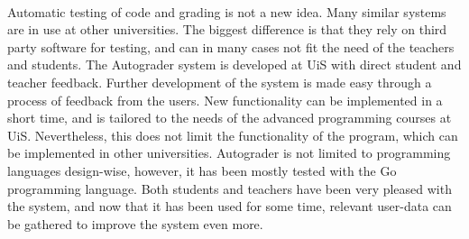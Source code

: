 \\Automatic testing of code and grading is not a new idea. Many similar systems are in use at other universities. The biggest difference is that they rely on third party software for testing, and can in many cases not fit the need of the teachers and students. The Autograder system is developed at UiS with direct student and teacher feedback. Further development of the system is made easy through a process of feedback from the users. New functionality can be implemented in a short time, and is tailored to the needs of the advanced programming courses at UiS. Nevertheless, this does not limit the functionality of the program, which can be implemented in other universities. Autograder is not limited to programming languages design-wise, however, it has been mostly tested with the Go programming language. Both students and teachers have been very pleased with the system, and now that it has been used for some time, relevant user-data can be gathered to improve the system even more.